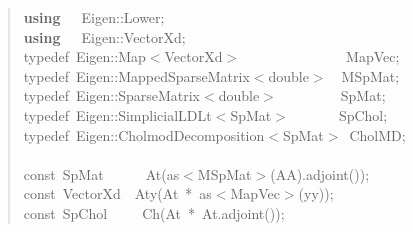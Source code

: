 \documentclass[shortnames,article]{jss}
\newcommand{\hlstd}[1]{\textcolor[rgb]{0,0,0}{#1}}
\newcommand{\hlopt}[1]{\textcolor[rgb]{0,0,0}{#1}}
\newcommand{\hlkwa}[1]{\textcolor[rgb]{0.61,0.13,0.93}{\bf{#1}}}
\newcommand{\hlkwb}[1]{\textcolor[rgb]{0.13,0.54,0.13}{#1}}
\newcommand{\hlkwc}[1]{\textcolor[rgb]{0,0,1}{#1}}
\newcommand{\hlkwd}[1]{\textcolor[rgb]{0,0,0}{#1}}
\begin{document}
\begin{figure}[htb]
  \begin{quote}
    \noindent
    \ttfamily
    \hlstd{}\hlkwa{using}\hlstd{\ \ \ }\hlkwa{}\hlstd{Eigen}\hlopt{::}\hlstd{Lower}\hlopt{;}\hspace*{\fill}\\
    \hlstd{}\hlkwa{using}\hlstd{\ \ \ }\hlkwa{}\hlstd{Eigen}\hlopt{::}\hlstd{VectorXd}\hlopt{;}\hspace*{\fill}\\
    \hlstd{}\hlkwc{typedef\ }\hlstd{Eigen}\hlopt{::}\hlstd{Map}\hlopt{$<$}\hlstd{VectorXd}\hlopt{$>$}\hlstd{\ \ \ \ \ \ \ \ \ \ \ \ \ \ \ }\hlopt{}\hlstd{MapVec}\hlopt{;}\hspace*{\fill}\\
    \hlstd{}\hlkwc{typedef\ }\hlstd{Eigen}\hlopt{::}\hlstd{MappedSparseMatrix}\hlopt{$<$}\hlstd{}\hlkwb{double}\hlstd{}\hlopt{$>$}\hlstd{\ \ }\hlopt{}\hlstd{MSpMat}\hlopt{;}\hspace*{\fill}\\
    \hlstd{}\hlkwc{typedef\ }\hlstd{Eigen}\hlopt{::}\hlstd{SparseMatrix}\hlopt{$<$}\hlstd{}\hlkwb{double}\hlstd{}\hlopt{$>$}\hlstd{\ \ \ \ \ \ \ \ \ }\hlopt{}\hlstd{SpMat}\hlopt{;}\hspace*{\fill}\\
    \hlstd{}\hlkwc{typedef\ }\hlstd{Eigen}\hlopt{::}\hlstd{SimplicialLDLt}\hlopt{$<$}\hlstd{SpMat}\hlopt{$>$}\hlstd{\ \ \ \ \ \ \ }\hlopt{}\hlstd{SpChol}\hlopt{;}\hspace*{\fill}\\
    \hlstd{}\hlkwc{typedef\ }\hlstd{Eigen}\hlopt{::}\hlstd{CholmodDecomposition}\hlopt{$<$}\hlstd{SpMat}\hlopt{$>$\ }\hlstd{CholMD}\hlopt{;}\hspace*{\fill}\\
    \hlstd{}\hspace*{\fill}\\
    \hlkwb{const\ }\hlstd{SpMat}\hlstd{\ \ \ \ \ \ }\hlstd{}\hlkwd{At}\hlstd{}\hlopt{(}\hlstd{as}\hlopt{$<$}\hlstd{MSpMat}\hlopt{$>$(}\hlstd{AA}\hlopt{).}\hlstd{}\hlkwd{adjoint}\hlstd{}\hlopt{());}\hspace*{\fill}\\
    \hlstd{}\hlkwb{const\ }\hlstd{VectorXd}\hlstd{\ \ }\hlstd{}\hlkwd{Aty}\hlstd{}\hlopt{(}\hlstd{At\ }\hlopt{{*}\ }\hlstd{as}\hlopt{$<$}\hlstd{MapVec}\hlopt{$>$(}\hlstd{yy}\hlopt{));}\hspace*{\fill}\\
    \hlstd{}\hlkwb{const\ }\hlstd{SpChol}\hlstd{\ \ \ \ \ }\hlstd{}\hlkwd{Ch}\hlstd{}\hlopt{(}\hlstd{At\ }\hlopt{{*}\ }\hlstd{At}\hlopt{.}\hlstd{}\hlkwd{adjoint}\hlstd{}\hlopt{());}\hspace*{\fill}\\

\end{quote}
\end{figure}
\end{document}
